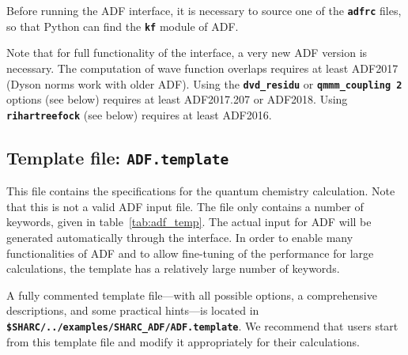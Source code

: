 \documentclass[a4paper,10pt,DIV=15,openany,twoside=false]{scrbook}
\newcommand{\ttt}[1]{\textbf{\texttt{#1}}}
\begin{document}
Before running the ADF interface, it is necessary to source one of the \ttt{adfrc} files, so that Python can find the \ttt{kf} module of ADF.

Note that for full functionality of the interface, a very new ADF version is necessary. The computation of wave function overlaps requires at least ADF2017 (Dyson norms work with older ADF). Using the \ttt{dvd\_residu} or \ttt{qmmm\_coupling 2} options (see below) requires at least ADF2017.207 or ADF2018. Using \ttt{rihartreefock} (see below) requires at least ADF2016. 

\subsection{Template file: \ttt{ADF.template}}

This file contains the specifications for the quantum chemistry calculation. Note that this is not a valid \textsc{ADF} input file. The file only contains a number of keywords, given in table~\ref{tab:adf_temp}. The actual input for \textsc{ADF} will be generated automatically through the interface.
In order to enable many functionalities of ADF and to allow fine-tuning of the performance for large calculations, the template has a relatively large number of keywords.

A fully commented template file---with all possible options, a comprehensive descriptions, and some practical hints---is located in \ttt{\$SHARC/../examples/SHARC\_ADF/ADF.template}.
We recommend that users start from this template file and modify it appropriately for their calculations.
\end{document}
